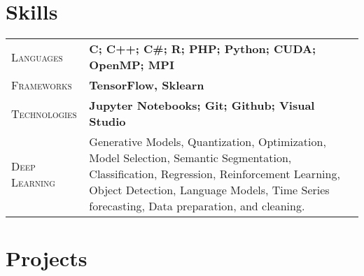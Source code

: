\documentclass[9pt, a4paper, oneside, final]{scrartcl} %
\newcommand{\gray}{\rowcolor[gray]{.90}} %
\begin{document}

\section{Skills}

\begin{center}
\begin{tabularx}{1.0\linewidth}{>{\raggedleft\scshape}p{2.2cm}X}
\gray Languages & \textbf{C; C++; C\#; R; PHP; Python; CUDA; OpenMP; MPI}\\ %
\gray Frameworks & \textbf{TensorFlow, Sklearn}\\ %
\gray Technologies & \textbf{Jupyter Notebooks; Git; Github; Visual Studio}\\
\gray Deep Learning & Generative Models, Quantization, Optimization, Model Selection, Semantic Segmentation, Classification, Regression, Reinforcement Learning, Object Detection, Language Models, Time Series forecasting, Data preparation, and cleaning.
\end{tabularx}
\end{center}


%


\section{Projects}
\end{document}
